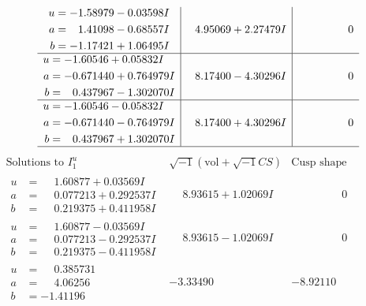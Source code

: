 \documentclass[1p]{elsarticle_modified}
\theoremstyle{definition}
\newcommand{\I}{\sqrt{-1}}
\begin{document}
$$\begin{array}{c|c|c}
\begin{aligned}
u &= -1.58979 - 0.03598 I \\
a &= \phantom{-}1.41098 - 0.68557 I \\
b &= -1.17421 + 1.06495 I\end{aligned}
 & \phantom{-}4.95069 + 2.27479 I & \phantom{-0.000000 } 0 \\ \hline\begin{aligned}
u &= -1.60546 + 0.05832 I \\
a &= -0.671440 + 0.764979 I \\
b &= \phantom{-}0.437967 - 1.302070 I\end{aligned}
 & \phantom{-}8.17400 - 4.30296 I & \phantom{-0.000000 } 0 \\ \hline\begin{aligned}
u &= -1.60546 - 0.05832 I \\
a &= -0.671440 - 0.764979 I \\
b &= \phantom{-}0.437967 + 1.302070 I\end{aligned}
 & \phantom{-}8.17400 + 4.30296 I & \phantom{-0.000000 } 0\\
 \hline 
 \end{array}$$\newpage$$\begin{array}{c|c|c}  
\text{Solutions to }I^u_{1}& \I (\text{vol} + \sqrt{-1}CS) & \text{Cusp shape}\\
 \hline 
\begin{aligned}
u &= \phantom{-}1.60877 + 0.03569 I \\
a &= \phantom{-}0.077213 + 0.292537 I \\
b &= \phantom{-}0.219375 + 0.411958 I\end{aligned}
 & \phantom{-}8.93615 + 1.02069 I & \phantom{-0.000000 } 0 \\ \hline\begin{aligned}
u &= \phantom{-}1.60877 - 0.03569 I \\
a &= \phantom{-}0.077213 - 0.292537 I \\
b &= \phantom{-}0.219375 - 0.411958 I\end{aligned}
 & \phantom{-}8.93615 - 1.02069 I & \phantom{-0.000000 } 0 \\ \hline\begin{aligned}
u &= \phantom{-}0.385731\phantom{ +0.000000I} \\
a &= \phantom{-}4.06256\phantom{ +0.000000I} \\
b &= -1.41196\phantom{ +0.000000I}\end{aligned}
 & -3.33490\phantom{ +0.000000I} & -8.92110\phantom{ +0.000000I} \\ \hline\begin{aligned}

\end{aligned}
\end{array}$$
\end{document}
